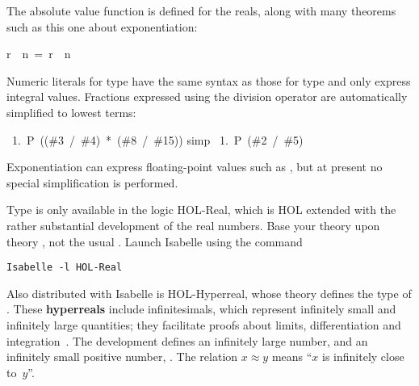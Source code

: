 The absolute value function  is
defined for the reals, along with many theorems such as this one about
exponentiation:
\begin{isabelle}
\isasymbar r\isasymbar \ \isacharcircum \ n\ =\ \isasymbar r\ \isacharcircum \ n\isasymbar 
{}
\end{isabelle}

Numeric literals
for type  have the same syntax as those for type
 and only express integral values.  Fractions expressed
using the division operator are automatically simplified to lowest terms:
\begin{isabelle}
\ 1.\ P\ ((\#3\ /\ \#4)\ *\ (\#8\ /\ \#15))\isanewline
{} simp\isanewline
\ 1.\ P\ (\#2\ /\ \#5)
\end{isabelle}
Exponentiation can express floating-point values such as
, but at present no special simplification
is performed.


\begin{warn}
Type  is only available in the logic HOL-Real, which
is  HOL extended with the rather substantial development of the real
numbers.  Base your theory upon theory
, not the usual .%
Launch Isabelle using the command 
\begin{verbatim}
Isabelle -l HOL-Real
\end{verbatim}
\end{warn}

Also distributed with Isabelle is HOL-Hyperreal,
whose theory  defines the type  of 
.  These
\textbf{hyperreals} include infinitesimals, which represent infinitely
small and infinitely large quantities; they facilitate proofs
about limits, differentiation and integration~\cite{fleuriot-jcm}.  The
development defines an infinitely large number,  and an
infinitely small positive number, .  The 
relation $x\approx y$ means ``$x$ is infinitely close to~$y$''.%
